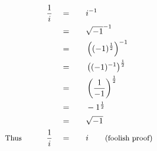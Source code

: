 \begin{alignat*}{5}
&\,&\frac{1}{i}\quad&=\quad&&i^{-1}\\
&\,&\,&=&&\sqrt{-1}^{-1}\\
&\,&\,&=&&\left((-1)^\frac{1}{2}\right)^{-1}\\
&\,&\,&=&&\left((-1)^{-1}\right)^\frac{1}{2}\\
&\,&\,&=&&\left(\frac{1}{-1}\right)^\frac{1}{2}\\
&\,&\,&=&&-1^\frac{1}{2}\\
&\,&\,&=&&\sqrt{-1}\\
&\small\text{Thus}\normalsize\qquad&\frac{1}{i}\quad&=&& i\qquad\small\text{(foolish proof)}
\end{alignat*}
